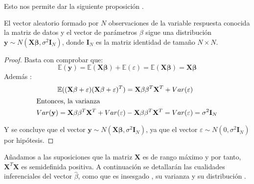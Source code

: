 Esto nos permite dar la siguiente proposición \cite{Cuadras 2014}.
\begin{propo}
El vector aleatorio formado por $N$ observaciones de la variable respuesta conocida la matriz de datos y el vector de parámetros $\beta$ sigue una distribución
$\mathbf{y}\sim N(\mathbf{X\beta}, \sigma^2\mathbf{I}_N)$, donde $\mathbf{I}_N$ es la matriz identidad de tamaño $N \times N$.  
\begin{proof}
Basta con comprobar que:
\begin{equation}
\mathbb{E}(\mathbf{y})=\mathbb{E}(\mathbf{X\beta})+\mathbb{E}(\varepsilon)=\mathbb{E}(\mathbf{X\beta})=\mathbf{X\beta}
\end{equation}
Además :
\begin{align}
\mathbb{E}((\mathbf{X\beta}+\varepsilon)(\mathbf{X\beta}+\varepsilon)^T)&=\mathbf{X\beta}\mathbf{\beta}^T \mathbf{X}^T+ Var(\varepsilon
)\\
\intertext{Entonces, la varianza}
Var(\mathbf{y})=\mathbf{X\beta}\mathbf{\beta}^T \mathbf{X}^T+ Var(\varepsilon
)&-\mathbf{X\beta}\mathbf{\beta}^T \mathbf{X}^T=Var(\varepsilon)=\sigma^2\mathbf{I}_N
\end{align}

\noindent Y se concluye que el vector $\mathbf{y}\sim N(\mathbf{X\beta}, \sigma^2\mathbf{I}_N)$, ya que el vector $\varepsilon\sim N(0,\sigma^2 \mathbf{I}_N)$\\ por hipótesis. 
\end{proof}
\end{propo}

\noindent Añadamos a las suposiciones  que la matriz $\mathbf{X}$ es de rango máximo y por tanto, $\mathbf{X}^T\mathbf{X}$ es semidefinida positiva.
A continuación se detallarán las cualidades inferenciales del vector $\hat{\beta}$, como que es insesgado \cite{Greene 2008}, su varianza \cite{Greene 2008,Hastie 2001,Johnson 2007} y su distribución \cite{Hastie 2001}. 

